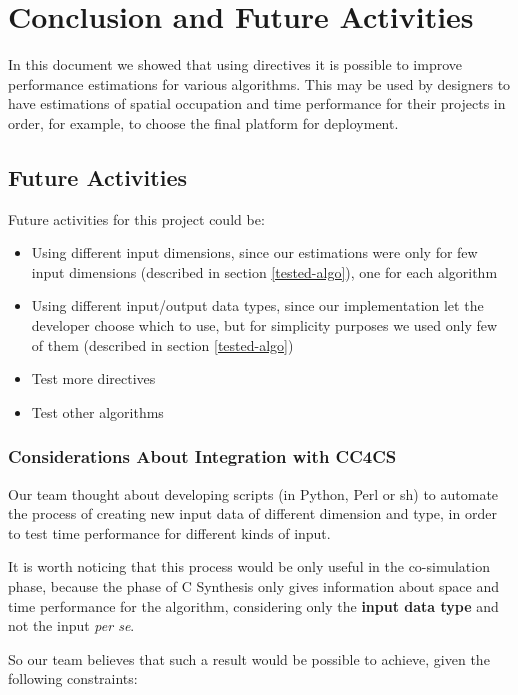 \chapter{Conclusion and Future Activities}
\label{chapter:conclusion}

In this document we showed that using directives it is possible to improve performance estimations for various algorithms. This may be used by designers to have estimations of spatial occupation and time performance for their projects in order, for example, to choose the final platform for deployment.

\section{Future Activities}

Future activities for this project could be:

\begin{itemize}[noitemsep]
	\item Using different input dimensions, since our estimations were only for few input dimensions (described in section \ref{tested-algo}), one for each algorithm
	\item Using different input/output data types, since our implementation let the developer choose which to use, but for simplicity purposes we used only few of them (described in section \ref{tested-algo})
	\item Test more directives
	\item Test other algorithms
\end{itemize}

\newpage

\subsection*{Considerations About Integration with CC4CS}

Our team thought about developing scripts (in Python, Perl or sh) to automate the process of creating new input data of different dimension and type, in order to test time performance for different kinds of input. 

It is worth noticing that this process would be only useful in the co-simulation phase, because the phase of C Synthesis only gives information about space and time performance for the algorithm, considering only the \textbf{input data type} and not the input \textit{per se}.

So our team believes that such a result would be possible to achieve, given the following constraints:

